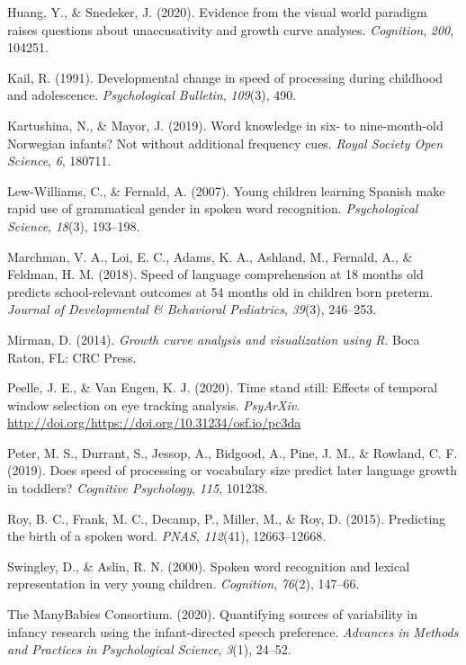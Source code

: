 \documentclass[10pt, letterpaper]{article}
\begin{document}
\leavevmode\hypertarget{ref-Huang2020}{}%
Huang, Y., \& Snedeker, J. (2020). Evidence from the visual world
paradigm raises questions about unaccusativity and growth curve
analyses. \emph{Cognition}, \emph{200}, 104251.

\leavevmode\hypertarget{ref-kail1991}{}%
Kail, R. (1991). Developmental change in speed of processing during
childhood and adolescence. \emph{Psychological Bulletin}, \emph{109}(3),
490.

\leavevmode\hypertarget{ref-Mayor2019}{}%
Kartushina, N., \& Mayor, J. (2019). Word knowledge in six- to
nine-month-old Norwegian infants? Not without additional frequency cues.
\emph{Royal Society Open Science}, \emph{6}, 180711.

\leavevmode\hypertarget{ref-Lew-Williams2007}{}%
Lew-Williams, C., \& Fernald, A. (2007). Young children learning Spanish
make rapid use of grammatical gender in spoken word recognition.
\emph{Psychological Science}, \emph{18}(3), 193--198.

\leavevmode\hypertarget{ref-Marchman2018}{}%
Marchman, V. A., Loi, E. C., Adams, K. A., Ashland, M., Fernald, A., \&
Feldman, H. M. (2018). Speed of language comprehension at 18 months old
predicts school-relevant outcomes at 54 months old in children born
preterm. \emph{Journal of Developmental \& Behavioral Pediatrics},
\emph{39}(3), 246--253.

\leavevmode\hypertarget{ref-Mirman2014}{}%
Mirman, D. (2014). \emph{Growth curve analysis and visualization using
R}. Boca Raton, FL: CRC Press.

\leavevmode\hypertarget{ref-Peelle2020}{}%
Peelle, J. E., \& Van Engen, K. J. (2020). Time stand still: Effects of
temporal window selection on eye tracking analysis. \emph{PsyArXiv}.
\url{http://doi.org/https://doi.org/10.31234/osf.io/pc3da}

\leavevmode\hypertarget{ref-peter2019}{}%
Peter, M. S., Durrant, S., Jessop, A., Bidgood, A., Pine, J. M., \&
Rowland, C. F. (2019). Does speed of processing or vocabulary size
predict later language growth in toddlers? \emph{Cognitive Psychology},
\emph{115}, 101238.

\leavevmode\hypertarget{ref-Roy2015}{}%
Roy, B. C., Frank, M. C., Decamp, P., Miller, M., \& Roy, D. (2015).
Predicting the birth of a spoken word. \emph{PNAS}, \emph{112}(41),
12663--12668.

\leavevmode\hypertarget{ref-Swingley2000}{}%
Swingley, D., \& Aslin, R. N. (2000). Spoken word recognition and
lexical representation in very young children. \emph{Cognition},
\emph{76}(2), 147--66.

\leavevmode\hypertarget{ref-TheManyBabiesConsortium2020}{}%
The ManyBabies Consortium. (2020). Quantifying sources of variability in
infancy research using the infant-directed speech preference.
\emph{Advances in Methods and Practices in Psychological Science},
\emph{3}(1), 24--52.


\end{document}

